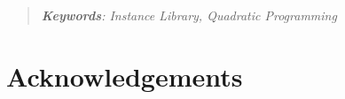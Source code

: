 \documentclass[smallextended]{svjour3}
\newenvironment{keywords}{\vspace{0.4in}\begin{quote}\small \em
{\bf Keywords\/}:}{\end{quote}}
\begin{document}
\else
 \begin{keywords}
  Instance Library, Quadratic Programming
 \end{keywords}
\fi




































\section{Acknowledgements}
\end{document}
